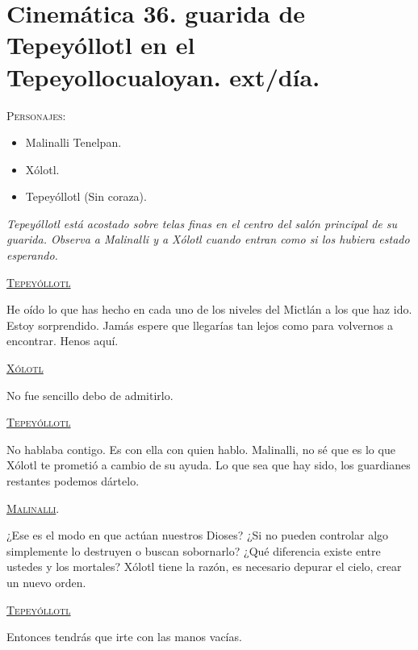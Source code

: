 \documentclass[11pt,letterpaper]{article}
\begin{document}
\section{Cinemática 36. guarida de Tepeyóllotl en el Tepeyollocualoyan. ext/día. }
 \textsc{Personajes}:
 \begin{itemize}
 \item Malinalli Tenelpan.
 \item Xólotl.
 \item Tepeyóllotl (Sin coraza).
 \end{itemize}
\textit{Tepeyóllotl está acostado sobre telas finas en el centro del salón principal de su guarida. Observa a Malinalli y a Xólotl cuando entran como si los hubiera estado esperando.}
\begin{center}
\textsc{\underline{Tepeyóllotl}}
\\
\par
He oído lo que has hecho en cada uno de los niveles del Mictlán a los que haz ido. Estoy sorprendido. Jamás espere que llegarías tan lejos como para volvernos a encontrar. Henos aquí.
\\
\par
\textsc{\underline{Xólotl}}
\\
\par
No fue sencillo debo de admitirlo.
\\
\par
\textsc{\underline{Tepeyóllotl}}
\\
\par
No hablaba contigo. Es con ella con quien hablo. Malinalli, no sé que es lo que Xólotl te prometió a cambio de su ayuda. Lo que sea que hay sido, los guardianes restantes podemos dártelo. 
\\
\par
\textsc{\underline{Malinalli}}.
\\
\par
¿Ese es el modo en que actúan nuestros Dioses? ¿Si no pueden controlar algo simplemente lo destruyen o buscan sobornarlo? ¿Qué diferencia existe entre ustedes y los mortales? Xólotl tiene la razón, es necesario depurar el cielo, crear un nuevo orden.
\\
\par
\textsc{\underline{Tepeyóllotl}}
\\
\par
Entonces tendrás que irte con las manos vacías.
\end{center}
\end{document}
